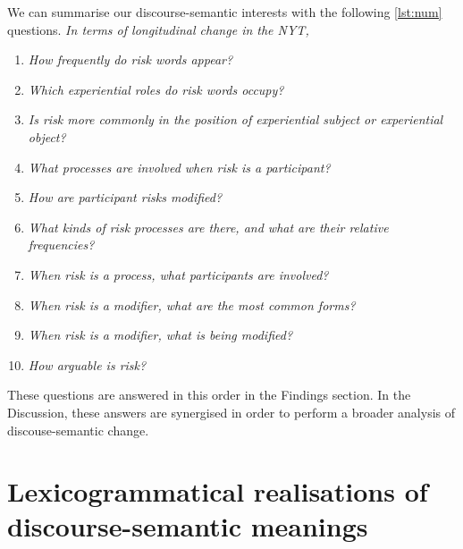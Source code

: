 				We can summarise our discourse-semantic interests with the following \ref{lst:num} questions. \emph{In terms of longitudinal change in the NYT,}

				\begin{enumerate}\setlength\itemsep{-0.5em}
					\item \emph{How frequently do risk words appear?}
					\item \emph{Which experiential roles do risk words occupy?}
					\item \emph{Is risk more commonly in the position of experiential subject or experiential object?}
					\item \emph{What processes are involved when risk is a participant?}
					\item \emph{How are participant risks modified?}
					\item \emph{What kinds of risk processes are there, and what are their relative frequencies?}
					\item \emph{When risk is a process, what participants are involved?}
					\item \emph{When risk is a modifier, what are the most common forms?}
					\item \emph{When risk is a modifier, what is being modified?}
					\item \emph{How arguable is risk?} \label{lst:num}
				\end{enumerate}
				These questions are answered in this order in the Findings section. In the Discussion, these answers are synergised in order to perform a broader analysis of discouse-semantic change.

		\section{Lexicogrammatical realisations of discourse-semantic meanings}

